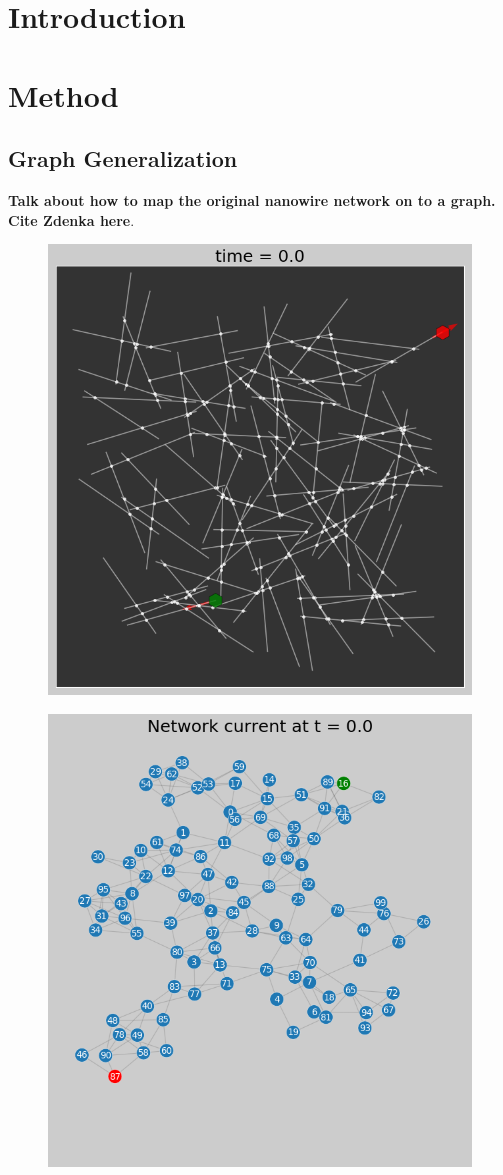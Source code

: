 \documentclass[%
 reprint,
 amsmath,amssymb,
 aps,
floatfix,
]{revtex4-2}
\begin{document}

\section{\label{sec:level1}  Introduction}
\section{\label{sec:level1} Method}

\subsection{Graph Generalization}

\textbf{Talk about how to map the original nanowire network on to a graph. Cite Zdenka here}.

\begin{figure}[h]
	\centering
	\includegraphics[width=0.7\linewidth]{figure/mpl_plot}
	\caption{}
	\label{fig:mpl_plot}
\end{figure}

\begin{figure}[h]
	\centering
	\includegraphics[width=0.8\linewidth]{figure/graph_plot}
	\caption{}
	\label{fig:graph_plot}
\end{figure}
\end{document}
